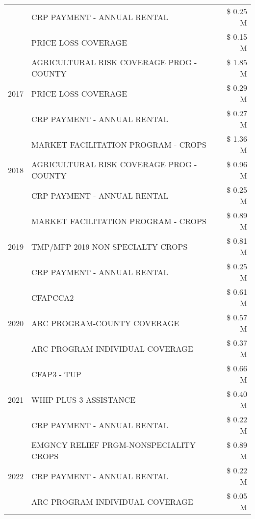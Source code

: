 \begin{tabular}{llr}
 & CRP PAYMENT - ANNUAL RENTAL & \$ 0.25 M \\
 & PRICE LOSS COVERAGE & \$ 0.15 M \\
\cline{1-3}
\multirow[t]{3}{*}{2017} & AGRICULTURAL RISK COVERAGE PROG - COUNTY & \$ 1.85 M \\
 & PRICE LOSS COVERAGE & \$ 0.29 M \\
 & CRP PAYMENT - ANNUAL RENTAL & \$ 0.27 M \\
\cline{1-3}
\multirow[t]{3}{*}{2018} & MARKET FACILITATION PROGRAM - CROPS & \$ 1.36 M \\
 & AGRICULTURAL RISK COVERAGE PROG - COUNTY & \$ 0.96 M \\
 & CRP PAYMENT - ANNUAL RENTAL & \$ 0.25 M \\
\cline{1-3}
\multirow[t]{3}{*}{2019} & MARKET FACILITATION PROGRAM - CROPS & \$ 0.89 M \\
 & TMP/MFP 2019 NON SPECIALTY CROPS & \$ 0.81 M \\
 & CRP PAYMENT - ANNUAL RENTAL & \$ 0.25 M \\
\cline{1-3}
\multirow[t]{3}{*}{2020} & CFAPCCA2 & \$ 0.61 M \\
 & ARC PROGRAM-COUNTY COVERAGE & \$ 0.57 M \\
 & ARC PROGRAM INDIVIDUAL COVERAGE & \$ 0.37 M \\
\cline{1-3}
\multirow[t]{3}{*}{2021} & CFAP3 - TUP & \$ 0.66 M \\
 & WHIP PLUS 3 ASSISTANCE & \$ 0.40 M \\
 & CRP PAYMENT - ANNUAL RENTAL & \$ 0.22 M \\
\cline{1-3}
\multirow[t]{3}{*}{2022} & EMGNCY RELIEF PRGM-NONSPECIALITY CROPS & \$ 0.89 M \\
 & CRP PAYMENT - ANNUAL RENTAL & \$ 0.22 M \\
 & ARC PROGRAM INDIVIDUAL COVERAGE & \$ 0.05 M \\
\cline{1-3}
\bottomrule
\end{tabular}
